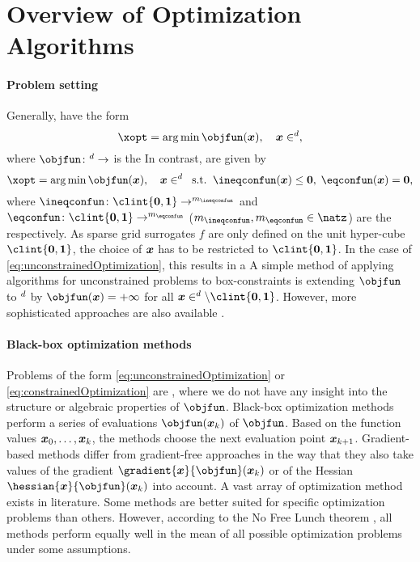 \section{Overview of Optimization Algorithms}
\label{sec:51algorithms}

\paragraph{Problem setting}

Generally,  have the form
\begin{equation}
  \label{eq:unconstrainedOptimization}
  \xopt = \argmin \objfun(\*x),\quad
  \*x \in \real^d,
\end{equation}
where $\objfun\colon \real^d \to \real$ is the 
In contrast,  are given by
\begin{equation}
  \label{eq:constrainedOptimization}
  \xopt = \argmin \objfun(\*x),\quad
  \*x \in \real^d\;\;\text{s.t.}\;\;
  \ineqconfun(\*x) \le \*0,\;
  \eqconfun(\*x) = \*0,
\end{equation}
where
$\ineqconfun\colon \clint{\*0, \*1} \to \real^{m_{\ineqconfun}}$ and
$\eqconfun\colon \clint{\*0, \*1} \to \real^{m_{\eqconfun}}$
($m_{\ineqconfun}, m_{\eqconfun} \in \natz$)
are the  respectively.
As sparse grid surrogates $f$ are only defined on the
unit hyper-cube $\clint{\*0, \*1}$,
the choice of ${\boldsymbol{x}}$ has to be restricted to $\clint{\*0, \*1}$.
In the case of \eqref{eq:unconstrainedOptimization},
this results in a 
A simple method of applying algorithms for unconstrained problems
to box-constraints is extending $\objfun$ to $\real^d$ by
$\objfun(\*x) = +\infty$ for all $\*x \in \real^d \setminus \clint{\*0, \*1}$.
However, more sophisticated
approaches are also available \cite{More87Optimization}.

\paragraph{Black-box optimization methods}

Problems of the form \eqref{eq:unconstrainedOptimization} or
\eqref{eq:constrainedOptimization} are ,
where we do not have any insight into the structure or algebraic
properties of $\objfun$.
Black-box optimization methods perform a series of evaluations
$\objfun(\*x_k)$ of $\objfun$.
Based on the function values ${\boldsymbol{x}}_0, \dotsc, {\boldsymbol{x}}_k$,
the methods choose the next evaluation point ${\boldsymbol{x}}_{k+1}$.
Gradient-based methods differ from gradient-free approaches
in the way that they also take values of the gradient
$\gradient{\*x}{\objfun}(\*x_k)$ or of the Hessian
$\hessian{\*x}{\objfun}(\*x_k)$ into account.
A vast array of optimization method exists in literature.
Some methods are better suited for specific optimization problems
than others.
However, according to the No Free Lunch theorem \cite{Wolpert97No},
all methods perform equally well in the mean of all possible
optimization problems under some assumptions.

